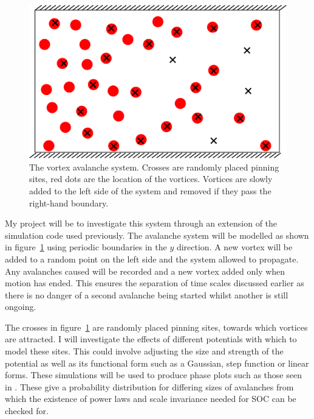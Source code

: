\documentclass{article}
\numberwithin{equation}{section}
\begin{document}
\begin{figure}[htb]
    \centering
    \includegraphics[width=0.8\linewidth]{Reports/ProjectProposal/Resources/avalanche_system.png}
    \caption{The vortex avalanche system. Crosses are randomly placed pinning sites, red dots are the location of the vortices. Vortices are slowly added to the left side of the system and removed if they pass the right-hand boundary.}
    \label{fig:avalanche_system}
\end{figure}
My project will be to investigate this system through an extension of the simulation code used previously. The avalanche system will be modelled as shown in figure~\ref{fig:avalanche_system} using periodic boundaries in the $y$ direction. A new vortex will be added to a random point on the left side and the system allowed to propagate. Any avalanches caused will be recorded and a new vortex added only when motion has ended. This ensures the separation of time scales discussed earlier as there is no danger of a second avalanche being started whilst another is still ongoing.

The crosses in figure~\ref{fig:avalanche_system} are randomly placed pinning sites, towards which vortices are attracted. I will investigate the effects of different potentials with which to model these sites. This could involve adjusting the size and strength of the potential as well as its functional form such as a Gaussian, step function or linear forms. These simulations will be used to produce phase plots such as those seen in \cite{Field1995SuperconductingAvalanches}. These give a probability distribution for differing sizes of avalanches from which the existence of power laws and scale invariance needed for SOC can be checked for.

\printbibliography
\end{document}
